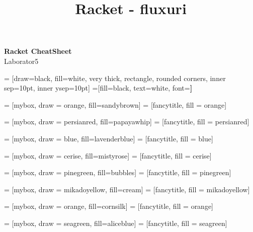 \documentclass[a4paper]{article}
\title{Racket - fluxuri}
\begin{document}
\begin{center}{\huge{\textbf{Racket CheatSheet}}}\\
{\large Laborator5}
\end{center}
\begin{multicols*}{3}

 = [draw=black, fill=white, very thick,
    rectangle, rounded corners, inner sep=10pt, inner ysep=10pt]
 =[fill=black, text=white, font=\bfseries]

 = [mybox, draw = orange, fill=sandybrown]
 = [fancytitle, fill = orange]


 = [mybox, draw = persianred, fill=papayawhip]
 = [fancytitle, fill = persianred]

 = [mybox, draw = blue, fill=lavenderblue]
 = [fancytitle, fill = blue]

 = [mybox, draw = cerise, fill=mistyrose]
 = [fancytitle, fill = cerise]

 = [mybox, draw = pinegreen, fill=bubbles]
 = [fancytitle, fill = pinegreen]

 = [mybox, draw = mikadoyellow, fill=cream]
 = [fancytitle, fill = mikadoyellow]

 = [mybox, draw = orange, fill=cornsilk]
 = [fancytitle, fill = orange]

 = [mybox, draw = seagreen, fill=aliceblue]
 = [fancytitle, fill = seagreen]


\end{multicols*}
\end{document}
